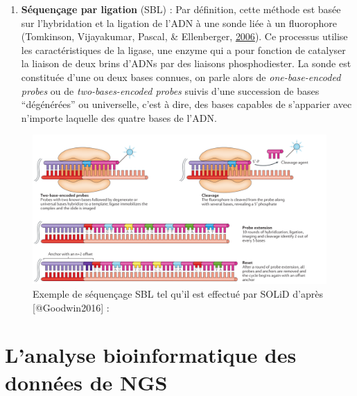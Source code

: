 \documentclass[12pt,twoside]{reedthesis}
\providecommand{\tightlist}{%
  \setlength{\itemsep}{0pt}\setlength{\parskip}{0pt}}
\theoremstyle{definition}
\theoremstyle{definition}
\theoremstyle{remark}
\begin{document}
  \begin{enumerate}
  \def\labelenumi{\arabic{enumi}.}
  \setcounter{enumi}{1}
  \tightlist
  \item
    \textbf{Séquençage par ligation} (SBL) : Par définition, cette méthode
    est basée sur l'hybridation et la ligation de l'ADN à une sonde liée à
    un fluorophore (Tomkinson, Vijayakumar, Pascal, \& Ellenberger,
    \protect\hyperlink{ref-Tomkinson2006}{2006}). Ce processus utilise les
    caractéristiques de la ligase, une enzyme qui a pour fonction de
    catalyser la liaison de deux brins d'ADNs par des liaisons
    phosphodiester. La sonde est constituée d'une ou deux bases connues,
    on parle alors de \emph{one-base-encoded probes} ou de
    \emph{two-bases-encoded probes} suivis d'une succession de bases
    ``dégénérées'' ou universelle, c'est à dire, des bases capables de
    s'apparier avec n'importe laquelle des quatre bases de l'ADN.
  \end{enumerate}
  
  \begin{figure}
  
  {\centering \includegraphics[scale=.26]{figure/SBL_seq_solid} 
  
  }
  
  \caption[Exemple de séquençage SBL tel qu'il est effectué par SOLiD]{Exemple de séquençage SBL tel qu'il est effectué par SOLiD d'après [@Goodwin2016] : }\label{fig:sblSeq}
  \end{figure}
  
  \newpage  
  
  \section{L'analyse bioinformatique des données de
  NGS}\label{lanalyse-bioinformatique-des-donnees-de-ngs}
  
\end{document}

